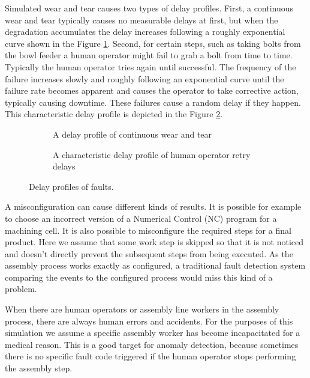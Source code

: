 \documentclass[procedia]{easychair}
\begin{document}
Simulated wear and tear causes two types of delay profiles. First,
a continuous wear and tear typically causes no measurable delays at first, but when the degradation accumulates the delay increases following
a roughly exponential curve shown in the Figure \ref{figure:continuouswearandtear}. Second, for certain steps, such as taking bolts from the bowl feeder a human operator
might fail to grab a bolt from time to time. Typically the human operator tries again until successful. The frequency of the failure increases
slowly and roughly following an exponential curve until the failure rate becomes apparent and causes the operator to take corrective action,
typically causing downtime. These failures cause a random delay if they happen. This characteristic delay profile is depicted in the Figure \ref{figure:retrydelays}.

\begin{figure}[tb]
\tiny
\begin{subfigure}[h]{0.5\linewidth}
 \resizebox{\linewidth}{!}{}
 \caption{A delay profile of continuous wear and tear\newline}
 \label{figure:continuouswearandtear}
\end{subfigure}
\begin{subfigure}[h]{0.5\linewidth}
 \resizebox{\linewidth}{!}{}
 \caption{A characteristic delay profile of human operator retry delays}
 \label{figure:retrydelays}
\end{subfigure}
 \caption{Delay profiles of faults.}
 \label{figure:delayprofiles}
\end{figure}

A misconfiguration can cause different kinds of results. It is possible for example to choose an incorrect version of a Numerical Control (NC) program for a machining cell. It is also possible to
misconfigure the required steps for a final product. Here we assume that some work step is skipped
so that it is not noticed and doesn't directly prevent the subsequent steps from being executed. As the assembly process works exactly as configured, a traditional fault detection system comparing
the events to the configured process would miss this kind of a problem.

When there are human operators or assembly line workers in the assembly process, there are always human errors and accidents. For the purposes of this simulation we
assume a specific assembly worker has become incapacitated for a medical reason. This is a good target for anomaly detection, because sometimes there is no specific fault code
triggered if the human operator stops performing the assembly step.
\end{document}
